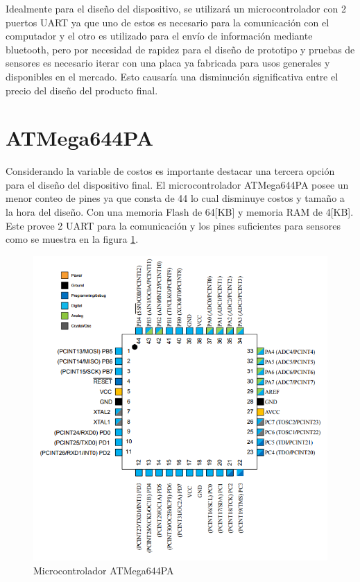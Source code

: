 Idealmente para el diseño del dispositivo, se utilizará un microcontrolador con 2 puertos UART ya que uno de estos es necesario para la comunicación con el computador y el otro es utilizado para el envío de información mediante bluetooth, pero por necesidad de rapidez para el diseño de prototipo y pruebas de sensores es necesario iterar con una placa ya fabricada para usos generales y disponibles en el mercado. Esto causaría una disminución significativa entre el precio del diseño del producto final. 
\newpage
\section{ATMega644PA}
Considerando la variable de costos es importante destacar una tercera opción para el diseño del dispositivo final. El microcontrolador ATMega644PA posee un menor conteo de pines ya que consta de 44 lo cual disminuye costos y tamaño a la hora del diseño. Con una memoria Flash de 64[KB] y memoria RAM de 4[KB]. Este provee 2 UART para la comunicación y los pines suficientes para sensores como se muestra en la figura \ref{644}.

\begin{figure}[H]
\centering
\includegraphics[scale=0.7]{figuras/mcu/644.png}
\caption{Microcontrolador ATMega644PA}
\label{644}
\end{figure}

